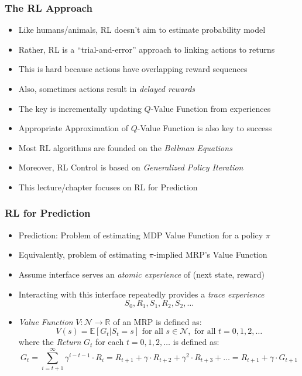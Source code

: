 \documentclass[handout]{beamer}
\begin{document}
\begin{frame}
\frametitle{The RL Approach}
\begin{itemize}[<+->]
\item Like humans/animals, RL doesn't aim to estimate probability model
\item Rather, RL is a ``trial-and-error'' approach to linking actions to returns
\item This is hard because actions have overlapping reward sequences
\item Also, sometimes actions result in {\em delayed rewards}
\item The key is incrementally updating $Q$-Value Function from experiences
\item Appropriate Approximation of $Q$-Value Function is also key to success
\item Most RL algorithms are founded on the {\em Bellman Equations}
\item Moreover, RL Control is based on {\em Generalized Policy Iteration}
\item This lecture/chapter focuses on RL for Prediction
\end{itemize}
\end{frame}


\begin{frame}
\frametitle{RL for Prediction}
\pause
\begin{itemize}[<+->]
\item Prediction: Problem of estimating MDP Value Function for a policy $\pi$
\item Equivalently, problem of estimating $\pi$-implied MRP's Value Function
\item Assume interface serves an {\em atomic experience} of (next state, reward)
\item Interacting with this interface repeatedly provides a {\em trace experience}
$$S_0, R_1, S_1, R_2, S_2, \ldots$$
\item {\em Value Function} $V: \mathcal{N} \rightarrow \mathbb{R}$ of an MRP is defined as:
$$V(s) = \mathbb{E}[G_t|S_t = s] \text{ for all } s \in \mathcal{N}, \text{ for all } t = 0, 1, 2, \ldots$$
where the {\em Return} $G_t$ for each $t = 0, 1, 2, \ldots$ is defined as:
$$G_t = \sum_{i=t+1}^{\infty} \gamma^{i-t-1} \cdot R_i = R_{t+1} + \gamma \cdot R_{t+2} + \gamma^2 \cdot R_{t+3} + \ldots = R_{t+1} + \gamma \cdot G_{t+1}$$
\end{itemize}
\end{frame}
\end{document}
